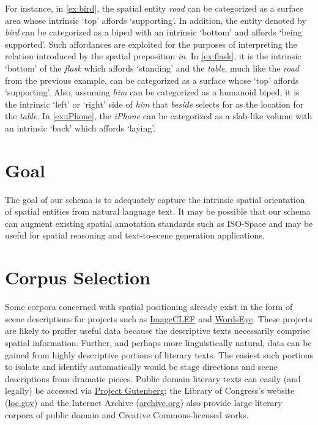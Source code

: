 \documentclass[11pt]{article}
\begin{document}
For instance, in \cref{ex:bird}, the spatial entity \emph{road} can be categorized as a surface area whose intrinsic `top' affords `supporting'. In addition, the entity denoted by \emph{bird} can be categorized as a biped with an intrinsic `bottom' and affords `being supported'. Such affordances are exploited for the purposes of interpreting the relation introduced by the spatial preposition \emph{in}. In \cref{ex:flask}, it is the intrinsic `bottom' of the \emph{flask} which affords `standing' and the \emph{table}, much like the \emph{road} from the previous example, can be categorized as a surface whose `top' affords `supporting'. Also, assuming \emph{him} can be categorized as a humanoid biped, it is the intrinsic `left' or `right' side of \emph{him} that \emph{beside} selects for as the location for the \emph{table}. In \cref{ex:iPhone}, the \emph{iPhone} can be categorized as a slab-like volume with an intrinsic `back' which affords `laying'.

\section{Goal} %
\label{sec:goal}
The goal of our schema is to adequately capture the intrinsic spatial orientation of spatial entities from natural language text. It may be possible that our schema can augment existing spatial annotation standards such as ISO-Space and may be useful for spatial reasoning and text-to-scene generation applications.

\section{Corpus Selection} %
\label{sec:corpus_selection}
Some corpora concerned with spatial positioning already exist in the form of scene descriptions for projects such as \href{http://imageclef.org/photodata}{ImageCLEF} and \href{http://lucky.cs.columbia.edu:2001/}{WordsEye}. These projects are likely to proffer useful data because the descriptive texts necessarily comprise spatial information. Further, and perhaps more linguistically natural, data can be gained from highly descriptive portions of literary texts. The easiest such portions to isolate and identify automatically would be stage directions and scene descriptions from dramatic pieces. Public domain literary texts can easily (and legally) be accessed via \href{http://www.gutenberg.org}{Project Gutenberg}; the Library of Congress's website (\href{loc.gov}{loc.gov}) and the Internet Archive (\href{archive.org}{archive.org}) also provide large literary corpora of public domain and Creative Commons-licensed works.
\end{document}
